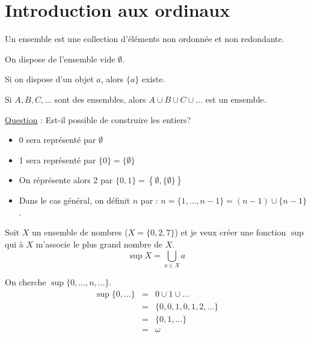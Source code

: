 \section{Introduction aux ordinaux}

\begin{definition}[Ensemble]
    Un ensemble est une collection d'éléments non ordonnée et non redondante.
\end{definition}

\begin{lemma}[Axiome 1]
    On dispose de l'ensemble vide \(\emptyset\). 
\end{lemma}

\begin{lemma}[Axiome 2]
    Si on dispose d'un objet \(a\), alors \(\{a\}\) existe.
\end{lemma}

\begin{lemma}[Axiome 3]
    Si \(A,B,C, \dots\) sont des ensembles, alors \(A \cup  B \cup C \cup \dots\) est un ensemble.
\end{lemma}

\begin{corollary}
    \underline{Question} : Est-il possible de construire les entiers?
    \begin{itemize}
        \item 0 sera représenté par \(\emptyset \) 
        \item 1 sera représenté par \(\{0\} = \{\emptyset\}\)
        \item On réprésente alors 2 par \(\{0,1\} = \left\{ \emptyset ,\{\emptyset\}  \right\}\)  
        \item Dans le cas général, on définit \(n\) par : \(n = \{1,\dots,n-1\} = (n-1) \cup \{n-1\}\).  
    \end{itemize}
\end{corollary}

\begin{definition}[Sup]
    Soit \(X\) un ensemble de nombres (\(X = \{0,2,7\}\)) et je veux créer une fonction \(\sup\) qui à \(X\) m'associe le plus grand nombre de \(X\).
    \[
        \sup X = \bigcup_{a \in X} a 
    \] 
\end{definition}

\begin{definition}[Infini]
    On cherche \(\sup \{0,\dots,n, \dots\}\). 
    \begin{eqnarray*}
        \sup \{0,\dots\} &=& 0 \cup 1 \cup \dots \\
        &=& \{0,0,1,0,1,2, \dots\} \\
        &=& \{0,1, \dots\} \\
        &=& \omega
    \end{eqnarray*}
\end{definition}

